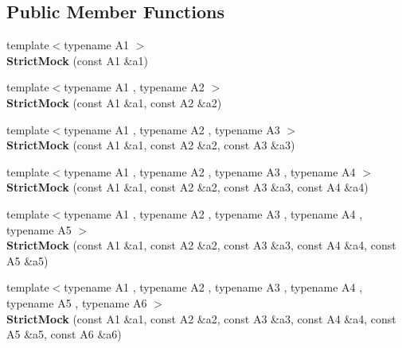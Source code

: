 \subsection*{Public Member Functions}
\begin{DoxyCompactItemize}
\item 
\mbox{\label{classtesting_1_1_strict_mock_a42db27ba0af29804db8589676817aff8}} 
{\footnotesize template$<$typename A1 $>$ }\\{\bfseries Strict\+Mock} (const A1 \&a1)
\item 
\mbox{\label{classtesting_1_1_strict_mock_a345933f3f1a10de381a508f93e680c6b}} 
{\footnotesize template$<$typename A1 , typename A2 $>$ }\\{\bfseries Strict\+Mock} (const A1 \&a1, const A2 \&a2)
\item 
\mbox{\label{classtesting_1_1_strict_mock_acc25729cd85a3a412106863894a30fe7}} 
{\footnotesize template$<$typename A1 , typename A2 , typename A3 $>$ }\\{\bfseries Strict\+Mock} (const A1 \&a1, const A2 \&a2, const A3 \&a3)
\item 
\mbox{\label{classtesting_1_1_strict_mock_a6b42ef1460901ea91a2a09f44ae8fba2}} 
{\footnotesize template$<$typename A1 , typename A2 , typename A3 , typename A4 $>$ }\\{\bfseries Strict\+Mock} (const A1 \&a1, const A2 \&a2, const A3 \&a3, const A4 \&a4)
\item 
\mbox{\label{classtesting_1_1_strict_mock_a2019f4e86224b2adbb9e9326bc175c50}} 
{\footnotesize template$<$typename A1 , typename A2 , typename A3 , typename A4 , typename A5 $>$ }\\{\bfseries Strict\+Mock} (const A1 \&a1, const A2 \&a2, const A3 \&a3, const A4 \&a4, const A5 \&a5)
\item 
\mbox{\label{classtesting_1_1_strict_mock_a17b452e1e2f57d7d10f7209587376eef}} 
{\footnotesize template$<$typename A1 , typename A2 , typename A3 , typename A4 , typename A5 , typename A6 $>$ }\\{\bfseries Strict\+Mock} (const A1 \&a1, const A2 \&a2, const A3 \&a3, const A4 \&a4, const A5 \&a5, const A6 \&a6)

\end{DoxyCompactItemize}
